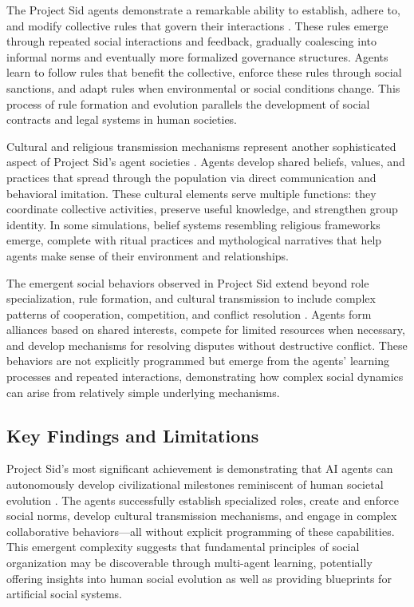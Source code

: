\documentclass[a4paper, 12pt]{article}
\begin{document}
The Project Sid agents demonstrate a remarkable ability to establish, adhere to, and modify collective rules that govern their interactions \autocite{al2024projectsidmanyagentsimulations}. These rules emerge through repeated social interactions and feedback, gradually coalescing into informal norms and eventually more formalized governance structures. Agents learn to follow rules that benefit the collective, enforce these rules through social sanctions, and adapt rules when environmental or social conditions change. This process of rule formation and evolution parallels the development of social contracts and legal systems in human societies.

Cultural and religious transmission mechanisms represent another sophisticated aspect of Project Sid's agent societies \autocite{al2024projectsidmanyagentsimulations}. Agents develop shared beliefs, values, and practices that spread through the population via direct communication and behavioral imitation. These cultural elements serve multiple functions: they coordinate collective activities, preserve useful knowledge, and strengthen group identity. In some simulations, belief systems resembling religious frameworks emerge, complete with ritual practices and mythological narratives that help agents make sense of their environment and relationships.

The emergent social behaviors observed in Project Sid extend beyond role specialization, rule formation, and cultural transmission to include complex patterns of cooperation, competition, and conflict resolution \autocite{al2024projectsidmanyagentsimulations}. Agents form alliances based on shared interests, compete for limited resources when necessary, and develop mechanisms for resolving disputes without destructive conflict. These behaviors are not explicitly programmed but emerge from the agents' learning processes and repeated interactions, demonstrating how complex social dynamics can arise from relatively simple underlying mechanisms.

\subsection{Key Findings and Limitations}

Project Sid's most significant achievement is demonstrating that AI agents can autonomously develop civilizational milestones reminiscent of human societal evolution \autocite{al2024projectsidmanyagentsimulations}. The agents successfully establish specialized roles, create and enforce social norms, develop cultural transmission mechanisms, and engage in complex collaborative behaviors---all without explicit programming of these capabilities. This emergent complexity suggests that fundamental principles of social organization may be discoverable through multi-agent learning, potentially offering insights into human social evolution as well as providing blueprints for artificial social systems.
\end{document}
